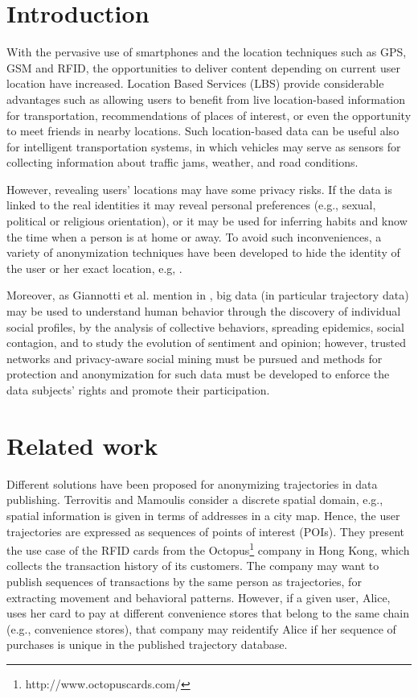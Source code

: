 \documentclass{llncs}
\begin{document}
\section{Introduction}

With the pervasive use of smartphones and the location techniques such as GPS, GSM and RFID, the opportunities to deliver content depending on current user location have increased.
Location Based Services (LBS) provide considerable advantages such as allowing users to benefit from live
location-based information for transportation, recommendations of places of interest, or even the opportunity to meet friends in nearby locations.
Such location-based data can be useful also for intelligent transportation systems, in which vehicles may serve as sensors for collecting information about traffic jams, weather, and road conditions.


However, revealing users' locations may have some privacy risks. If the data is linked to the real identities it may reveal personal preferences (e.g., sexual, political or religious orientation), or it may be used for inferring habits and know the time when a person is at home or away.
To avoid such inconveniences, a variety of anonymization techniques have been developed to hide the identity of the user or her exact location, e.g, \cite{Terrovitis:2011}.


Moreover, as Giannotti et al. mention in \cite{Giannotti2012}, big data (in particular trajectory data) may be used  to understand human behavior through the discovery of individual social profiles, by the analysis of collective behaviors, spreading epidemics, social contagion, and to study the evolution of sentiment and opinion; however, trusted networks and privacy-aware social mining must be pursued and methods for protection and anonymization for such data must be developed to enforce the data subjects' rights and promote their participation.

\section{Related work}
Different solutions have been proposed for anonymizing trajectories in data publishing. 
Terrovitis and Mamoulis \cite{Terrovitis:2008} consider a discrete spatial domain, e.g., spatial information is given in terms of addresses in a city map.
Hence, the user trajectories are expressed as sequences of points of interest (POIs).
They present the use case of the RFID cards from the Octopus\footnote{http://www.octopuscards.com/} company in Hong Kong, which collects the transaction history of its customers. The company may want to publish sequences of transactions by the same person as trajectories, for extracting movement and behavioral patterns. However, if a given user, Alice, uses her card to pay at different convenience stores that belong to the same chain (e.g., convenience stores), that company may reidentify Alice if her sequence of purchases is unique in the published trajectory database.
\end{document}
